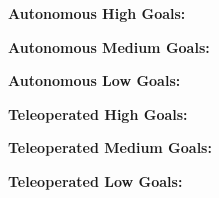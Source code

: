 \documentclass{article}
\begin{document}
{\noindent\begin{minipage}{.13\linewidth} %
	\begin{center}
		\textbf{Autonomous \linebreak High Goals:} \\[1em]
	\end{center}
\end{minipage}
\begin{minipage}{.15\linewidth} %
	\begin{center}
		\textbf{Autonomous \linebreak Medium Goals:} \\[1em]
	\end{center}
\end{minipage}
\begin{minipage}{.13\linewidth} %
	\begin{center}
		\textbf{Autonomous \linebreak Low Goals:} \\[1em]
	\end{center}
\end{minipage}
\hfill
\begin{minipage}{.13\linewidth} %
	\begin{center}
		\textbf{Teleoperated \linebreak High Goals:} \\[1em]
	\end{center}
\end{minipage}
\begin{minipage}{.15\linewidth} %
	\begin{center}
		\textbf{Teleoperated \linebreak Medium Goals:} \\[1em]
	\end{center}
\end{minipage}
\begin{minipage}{.13\linewidth} %
	\begin{center}
		\textbf{Teleoperated \linebreak Low Goals:} \\[1em]
	\end{center}
\end{minipage}
\\[1em]

\vfill

\begin{center}
\end{center}

}
	
\end{document}
